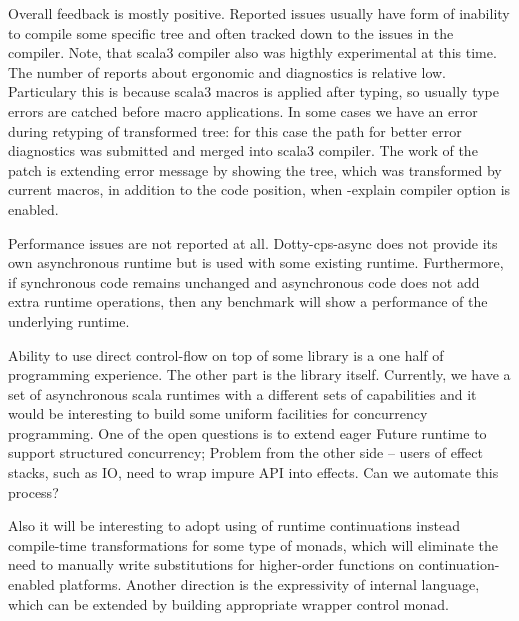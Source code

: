 \documentclass{llncs}
\begin{document}
  Overall feedback is mostly positive.  Reported issues usually have form of inability to compile some specific tree and often
   tracked down to the issues in the compiler. Note, that scala3 compiler also was higthly experimental at this time.  The number of reports about ergonomic and diagnostics is relative low.  Particulary this is because scala3 macros is applied after typing, so usually type errors are catched before macro applications. In some cases we have an error during retyping of transformed tree: for this case the path for better error diagnostics was submitted and merged into scala3 compiler.  The work of the patch is extending error message by showing the tree, which was transformed by current macros, in addition to the code  position, when -explain compiler option is enabled.
   
 Performance issues are not reported at all.  Dotty-cps-async does not provide its own asynchronous runtime but is used with some existing runtime.  Furthermore, if synchronous code remains unchanged and asynchronous code does not add extra runtime operations, then any benchmark will show a performance of the underlying runtime.

  Ability to use direct control-flow on top of some library is a one half of programming experience.  The other part is the library itself.  Currently, we have a set of asynchronous scala runtimes with a different sets of capabilities and it would be interesting to build some uniform facilities for concurrency programming.  One of the open questions is to extend eager Future runtime to support structured concurrency; Problem from the other side -- users of effect stacks, such as IO, need to wrap impure API into effects. Can we automate this process?   

 Also it will be interesting to adopt using of runtime continuations instead compile-time transformations for some type of monads, which will eliminate the need to manually write substitutions for higher-order functions on continuation-enabled platforms. 
     Another direction is the expressivity of internal language, which can be extended by building appropriate wrapper control monad. 


\end{document}
